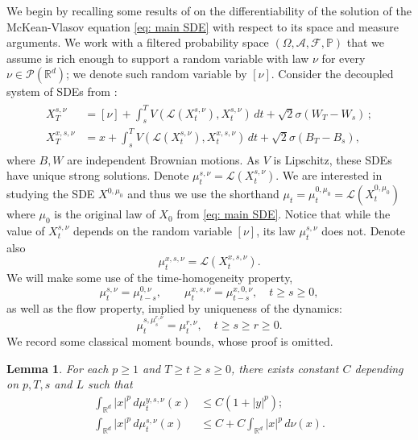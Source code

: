 \documentclass[11pt,reqno]{amsart}
\numberwithin{equation}{section}
\newtheorem{lemma}[theorem]{Lemma}
\theoremstyle{definition}
\def\R{{\mathbb R}}
\def\P{{\mathbb P}}
\def\Law{\mathcal{L}}
\begin{document}
We begin by recalling some results of \cite{Buckdahn2017-op} on the differentiability of the solution of the McKean-Vlasov equation \eqref{eq: main SDE} with respect to its space and measure arguments. We work with a filtered probability space $(\Omega,\mathcal A, \mathcal F,\P)$ that we assume is rich enough to support a random variable with law $\nu$ for every $\nu \in \mathcal P(\R^d)$; we denote such random variable by $[\nu]$. Consider the decoupled system of SDEs from \cite{Buckdahn2017-op}:
\begin{align}
\begin{split}
\label{eq: linearized process}
    X^{s,\nu}_T&=[\nu]+\int_s^T  V(\Law(X^{s,\nu}_t),X^{s,\nu}_t)\,dt+\sqrt 2\sigma (W_T-W_s)\,;\\
X^{x,s,\nu}_T&=x+\int_s^T V(\Law(X^{s,\nu}_t),X^{x,s,\nu}_t)\,dt+\sqrt 2 \sigma (B_T-B_s),
\end{split}
\end{align}
where $B,W$ are independent Brownian motions. 
As $V$ is Lipschitz, these SDEs have unique strong solutions. Denote $\mu_t^{s,\nu}=\Law(X^{s,\nu}_t)$. We are interested in studying the SDE $X^{0,\mu_0}$ and thus we use the shorthand $\mu_t=\mu_t^{0,\mu_0}=\Law(X_t^{0,\mu_0})$ where $\mu_0$ is the original law of $X_0$ from \eqref{eq: main SDE}. Notice that while the value of $X_t^{s,\nu}$ depends on the random variable $[\nu]$, its law $\mu_t^{s,\nu}$ does not. Denote also
\[\mu_t^{x,s,\nu}= \Law(X_t^{x,s,\nu}).\]
We will make some use of the time-homogeneity property,
\begin{equation} \label{eq:MVtimehomo}
\mu^{s,\nu}_t = \mu^{0,\nu}_{t-s}, \qquad \mu^{x,s,\nu}_t = \mu^{x,0,\nu}_{t-s}, \quad t \ge s \ge 0,
\end{equation}
as well as the flow property, implied by uniqueness of the dynamics:
\begin{equation} \label{eq:MVflow}
\mu^{s,\mu^{r,\nu}_s}_t = \mu^{r,\nu}_{t}, \quad t \ge s \ge r \ge 0.
\end{equation}
We record some classical moment bounds, whose proof is omitted.
\begin{lemma} \label{lem:flow moment bounds}
    For each $p\geq 1$ and $T\ge t \ge s\ge 0$, there exists constant $C$ depending on $p,T,s$ and $L$ such that 
    \begin{align*}
        \int_{\R^d}|x|^p\,d\mu_t^{y,s,\nu}(x)&\leq C (1+|y|^p);\\
        \int_{\R^d}|x|^p\,d\mu^{s,\nu}_t(x)&\leq C+C\int_{\R^d} |x|^p\,d\nu(x).
    \end{align*}
\end{lemma}
\end{document}
